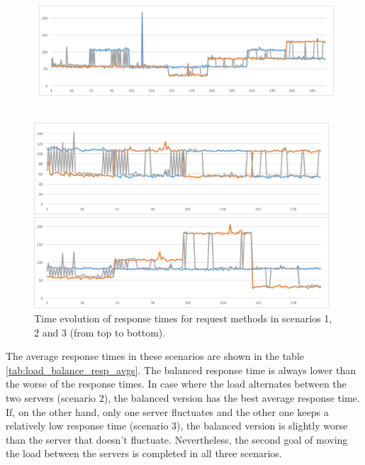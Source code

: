 \begin{figure}[h!]
	\captionsetup{justification=centering,margin=0.5cm}
	\centerline{
		\mbox{
			\includegraphics[width=110mm]{./img/load_balance_scen1.png}
		}
	}
	\centerline{
		\mbox{\includegraphics[width=110mm]{./img/load_balance_scen2.png}}
	}
	\centerline{
		\mbox{\includegraphics[width=110mm]{./img/load_balance_scen3.png}}
	}
	\caption{Time evolution of response times for request methods in scenarios 1, 2 and 3 (from top to bottom).}
	\label{fig:load_balance_scen}
\end{figure}

The average response times in these scenarios are shown in the table \ref{tab:load_balance_resp_avgs}. The balanced response time is always lower than the worse of the response times. In case where the load alternates between the two servers (scenario 2), the balanced version has the best average response time. If, on the other hand, only one server fluctuates and the other one keeps a relatively low response time (scenario 3), the balanced version is slightly worse than the server that doesn't fluctuate. Nevertheless, the second goal of moving the load between the servers is completed in all three scenarios.

